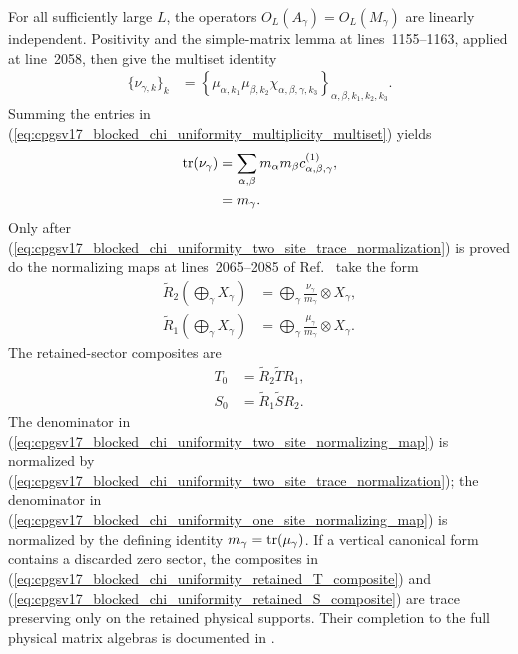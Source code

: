 \documentclass{article}
\begin{document}
For all sufficiently large $L$, the operators
$O_L(A_\gamma)=O_L(M_\gamma)$ are linearly independent. Positivity and the
simple-matrix lemma at lines~1155--1163, applied at line~2058, then give the
multiset identity
\begin{align}
    \{\nu_{\gamma,k}\}_k
        &=
        \left\{\mu_{\alpha,k_1}\mu_{\beta,k_2}
        \chi_{\alpha,\beta,\gamma,k_3}\right\}_{\alpha,\beta,k_1,k_2,k_3}.
\label{eq:cpgsv17_blocked_chi_uniformity_multiplicity_multiset}
\end{align}
Summing the entries in
(\ref{eq:cpgsv17_blocked_chi_uniformity_multiplicity_multiset}) yields
\begin{align}
    \operatorname{tr}(\nu_\gamma)
        &= \sum_{\alpha,\beta}
            m_\alpha m_\beta c^{(1)}_{\alpha,\beta,\gamma},
\label{eq:cpgsv17_blocked_chi_uniformity_two_site_trace_sum}\\
        &= m_\gamma.
\label{eq:cpgsv17_blocked_chi_uniformity_two_site_trace_normalization}
\end{align}
Only after
(\ref{eq:cpgsv17_blocked_chi_uniformity_two_site_trace_normalization}) is
proved do the normalizing maps at lines~2065--2085 of
Ref.~\cite{Cirac2016MPDO_arXiv} take the form
\begin{align}
    \widetilde R_2\!\left(\bigoplus_\gamma X_\gamma\right)
        &= \bigoplus_\gamma
            \frac{\nu_\gamma}{m_\gamma}\otimes X_\gamma,
\label{eq:cpgsv17_blocked_chi_uniformity_two_site_normalizing_map}\\
    \widetilde R_1\!\left(\bigoplus_\gamma X_\gamma\right)
        &= \bigoplus_\gamma
            \frac{\mu_\gamma}{m_\gamma}\otimes X_\gamma.
\label{eq:cpgsv17_blocked_chi_uniformity_one_site_normalizing_map}
\end{align}
The retained-sector composites are
\begin{align}
    T_0 &= \widetilde R_2\widetilde T R_1,
\label{eq:cpgsv17_blocked_chi_uniformity_retained_T_composite}\\
    S_0 &= \widetilde R_1\widetilde S R_2.
\label{eq:cpgsv17_blocked_chi_uniformity_retained_S_composite}
\end{align}
The denominator in
(\ref{eq:cpgsv17_blocked_chi_uniformity_two_site_normalizing_map}) is
normalized by
(\ref{eq:cpgsv17_blocked_chi_uniformity_two_site_trace_normalization}); the
denominator in
(\ref{eq:cpgsv17_blocked_chi_uniformity_one_site_normalizing_map}) is
normalized by the defining identity $m_\gamma=\operatorname{tr}(\mu_\gamma)$. If a
vertical canonical form contains a discarded zero sector, the composites in
(\ref{eq:cpgsv17_blocked_chi_uniformity_retained_T_composite}) and
(\ref{eq:cpgsv17_blocked_chi_uniformity_retained_S_composite}) are trace
preserving only on the retained physical supports. Their completion to the
full physical matrix algebras is documented in
.
\end{document}
